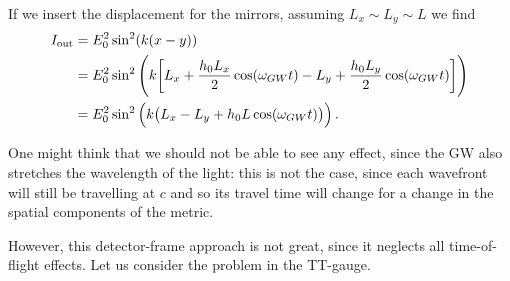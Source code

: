 \documentclass[main.tex]{subfiles}
\begin{document}
If we insert the displacement for the mirrors, assuming \(L_x \sim L_y \sim L\) we find 
%
\begin{align}
I _{\text{out}} 
&= E_0^2 \sin^2(k(x-y))  \\
&= E_0^2 \sin^2 \qty(k \qty[L_x + \frac{h_0 L_x}{2} \cos(\omega_{GW} t) - L_y + \frac{h_0 L_y}{2} \cos(\omega_{GW} t)]) \\
&= E_0^2 \sin^2 \qty(k \qty(L_x - L_y + h_0 L \cos(\omega_{GW} t)))
\,.
\end{align}

One might think that we should not be able to see any effect, since the GW also stretches the wavelength of the light: this is not the case, since each wavefront will still be travelling at \(c\) and so its travel time will change for a change in the spatial components of the metric. 

However, this detector-frame approach is not great, since it neglects all time-of-flight effects. Let us consider the problem in the TT-gauge. 
\end{document}
